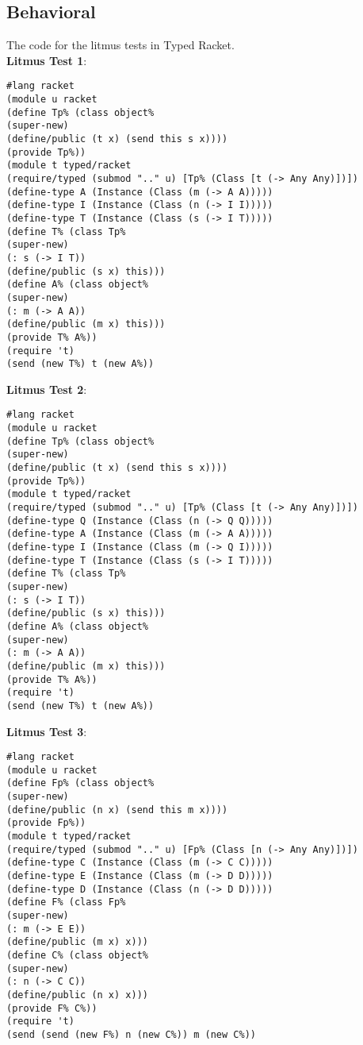 \documentclass[]{article}
\begin{document}
\subsection*{Behavioral}

The code for the litmus tests in Typed Racket. \\

\noindent\textbf{Litmus Test 1}:

\begin{verbatim}
#lang racket
(module u racket
(define Tp% (class object%
(super-new)
(define/public (t x) (send this s x))))
(provide Tp%))
(module t typed/racket
(require/typed (submod ".." u) [Tp% (Class [t (-> Any Any)])])
(define-type A (Instance (Class (m (-> A A)))))
(define-type I (Instance (Class (n (-> I I)))))
(define-type T (Instance (Class (s (-> I T)))))
(define T% (class Tp%
(super-new)
(: s (-> I T))
(define/public (s x) this)))
(define A% (class object%
(super-new)
(: m (-> A A))
(define/public (m x) this)))
(provide T% A%))
(require 't)
(send (new T%) t (new A%))
\end{verbatim}

\noindent\textbf{Litmus Test 2}:

\begin{verbatim}
#lang racket
(module u racket
(define Tp% (class object%
(super-new)
(define/public (t x) (send this s x))))
(provide Tp%))
(module t typed/racket
(require/typed (submod ".." u) [Tp% (Class [t (-> Any Any)])])
(define-type Q (Instance (Class (n (-> Q Q)))))
(define-type A (Instance (Class (m (-> A A)))))
(define-type I (Instance (Class (m (-> Q I)))))
(define-type T (Instance (Class (s (-> I T)))))
(define T% (class Tp%
(super-new)
(: s (-> I T))
(define/public (s x) this)))
(define A% (class object%
(super-new)
(: m (-> A A))
(define/public (m x) this)))
(provide T% A%))
(require 't)
(send (new T%) t (new A%))
\end{verbatim}

\noindent\textbf{Litmus Test 3}:

\begin{verbatim}
#lang racket
(module u racket
(define Fp% (class object%
(super-new)
(define/public (n x) (send this m x))))
(provide Fp%))
(module t typed/racket
(require/typed (submod ".." u) [Fp% (Class [n (-> Any Any)])])
(define-type C (Instance (Class (m (-> C C)))))
(define-type E (Instance (Class (m (-> D D)))))
(define-type D (Instance (Class (n (-> D D)))))
(define F% (class Fp%
(super-new)
(: m (-> E E))
(define/public (m x) x)))
(define C% (class object%
(super-new)
(: n (-> C C))
(define/public (n x) x)))
(provide F% C%))
(require 't)
(send (send (new F%) n (new C%)) m (new C%))
\end{verbatim}
\end{document}
